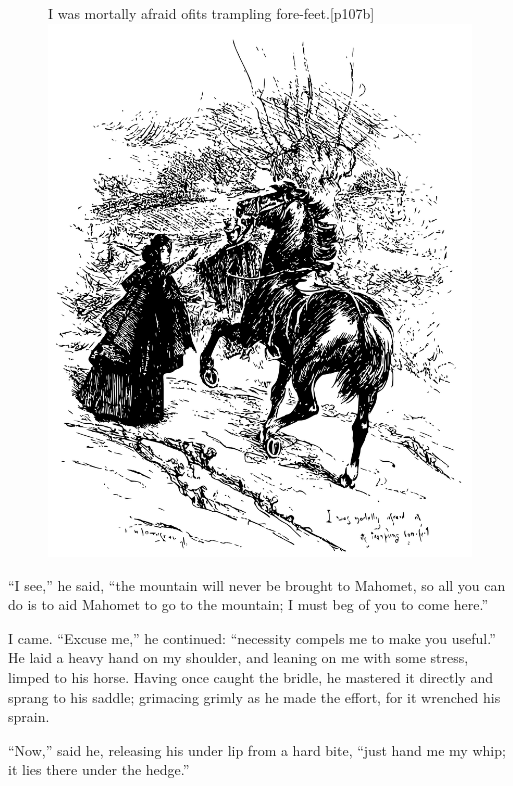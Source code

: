\begin{figure}
	\begin{sidecaption}{I was mortally afraid of\linebreak its trampling fore-feet.}[p107b]
		\centering
		\includegraphics[width=\linewidth]{images/p107b.pdf}
	\end{sidecaption}
\end{figure}

\enquote{I see,} he said, \enquote{the mountain will never be brought to
Mahomet, so all you can do is to aid Mahomet to go to the mountain; I
must beg of you to come here.}

I came. \enquote{Excuse me,} he continued: \enquote{necessity compels
me to make you useful.} He laid a heavy hand on my shoulder, and
leaning on me with some stress, limped to his horse. Having once caught
the bridle, he mastered it directly and sprang to his saddle; grimacing
grimly as he made the effort, for it wrenched his sprain.

\enquote{Now,} said he, releasing his under lip from a hard bite,
\enquote{just hand me my whip; it lies there under the hedge.}

